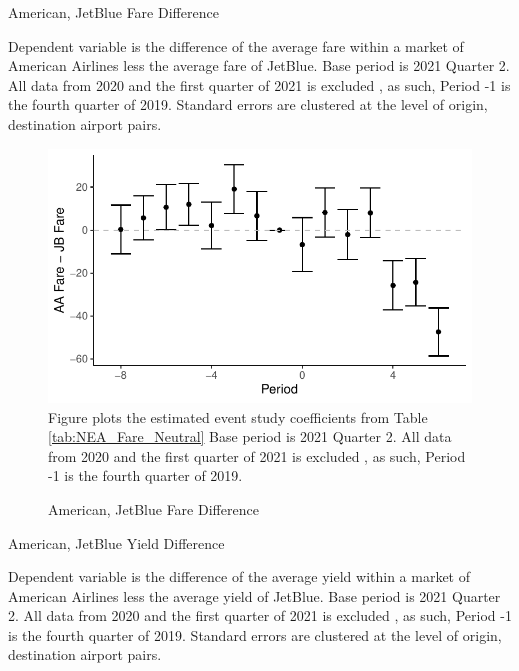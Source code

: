 \documentclass{article}
\begin{document}
\begin{appendices}
	
	\begin{table}
		\caption{American, JetBlue Fare Difference}
		\label{tab:NEA_Fare_Neutral}
		
		\footnotesize{Dependent variable is the difference of the average fare within a market of American Airlines less the average fare of JetBlue. Base period is 2021 Quarter 2. All data from 2020 and the first quarter of 2021 is excluded , as such,  Period -1 is the fourth quarter of 2019. Standard errors are clustered at the level of origin, destination airport pairs.}
	\end{table}
	
	\begin{figure}
		\caption{American, JetBlue Fare Difference}
		\label{fig:NEA_Fare_Neutral}
		\includegraphics[width = \linewidth]{NEA_Price_Neutrality_Graph}
		\footnotesize{Figure plots the estimated event study coefficients from Table \ref{tab:NEA_Fare_Neutral} Base period is 2021 Quarter 2. All data from 2020 and the first quarter of 2021 is excluded , as such,  Period -1 is the fourth quarter of 2019.}
	\end{figure}
	
	\begin{table}
		\caption{American, JetBlue Yield Difference}
		\label{tab:NEA_Yield_Neutral}
		
		\footnotesize{Dependent variable is the difference of the average yield within a market of American Airlines less the average yield of JetBlue. Base period is 2021 Quarter 2. All data from 2020 and the first quarter of 2021 is excluded , as such,  Period -1 is the fourth quarter of 2019. Standard errors are clustered at the level of origin, destination airport pairs.}
	\end{table}
	

\end{appendices}
\end{document}
